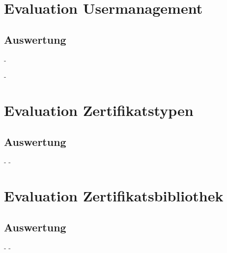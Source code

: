 \section{Evaluation Usermanagement}
\subsection{Auswertung}
-

-


\section{Evaluation Zertifikatstypen}
\subsection{Auswertung}
-
-



\section{Evaluation Zertifikatsbibliothek}
\subsection{Auswertung}
-
-